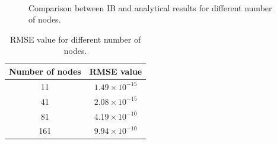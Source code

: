 \begin{figure}[H]
	\centering
	\quad
	\\
	\quad
	\caption{Comparison between IB and analytical results for different number of nodes.}
	\label{fig:C3_ghostCell_nodeNumber}
\end{figure}

\begin{table}[H]
\centering
\begin{tabular}{c | c}
	 Number of nodes & RMSE value \\ \hline \hline
	 11 & $1.49 \times 10^{-15}$ \\ \hline
	 41 & $2.08 \times 10^{-15}$ \\ \hline
	 81 & $4.19 \times 10^{-10}$ \\ \hline
	 161 & $9.94 \times 10^{-10}$ \\
\end{tabular}
\caption{RMSE value for different number of nodes.}
\label{table:C3_ghostCell_nodeNumber_RMSE}
\end{table}

